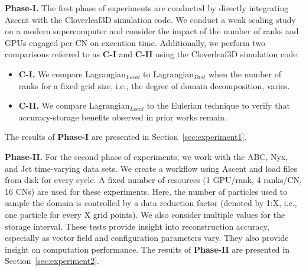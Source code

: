 %
\textbf{Phase-I.} The first phase of experiments are conducted by directly integrating Ascent with the Cloverleaf3D simulation code. 
%
We conduct a weak scaling study on a modern supercomputer and consider the impact of the number of ranks and GPUs engaged per CN on execution time. 
%
Additionally, we perform two comparisons referred to as \textbf{C-I} and \textbf{C-II} using the Cloverleaf3D simulation code: 
%
\begin{itemize}[leftmargin=*]
\item\textbf{C-I.} We compare Lagrangian$_{Local}$ to Lagrangian$_{Dist}$ when the number of ranks for a fixed grid size, i.e., the degree of domain decomposition, varies.
%
\item\textbf{C-II.} We compare Lagrangian$_{Local}$ to the Eulerian technique to verify that accuracy-storage benefits observed in prior works remain. 
\end{itemize}
%
The results of \textbf{Phase-I} are presented in Section~\ref{sec:experiment1}.

\textbf{Phase-II.} For the second phase of experiments, we work with the ABC, Nyx, and Jet time-varying data sets.
%
We create a workflow using Ascent and load files from disk for every cycle.
%
A fixed number of resources (1 GPU/rank, 4 ranks/CN, 16 CNs) are used for these experiments.
%
Here, the number of particles used to sample the domain is controlled by a data reduction factor (denoted by 1:X, i.e., one particle for every X grid points). 
%
%
We also consider multiple values for the storage interval. 
%
These tests provide insight into reconstruction accuracy, especially as vector field and configuration parameters vary. 
%
They also provide insight on computation performance.
%
The results of \textbf{Phase-II} are presented in Section~\ref{sec:experiment2}.

%

